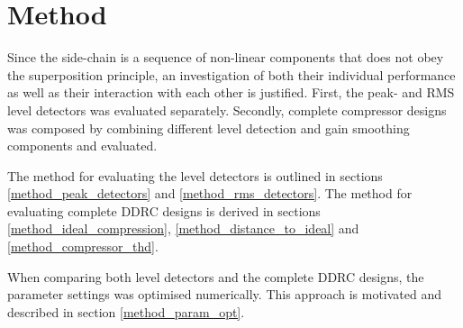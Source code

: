 \documentclass[../main2.tex]{subfiles}
\providecommand{\rootdir}{..}
\begin{document}
\section{Method}\label{method}
Since the side-chain is a sequence of non-linear components that does not obey the superposition principle, an investigation of both their individual performance as well as their interaction with each other is justified. First, the peak- and RMS level detectors was evaluated separately. Secondly, complete compressor designs was composed by combining different level detection and gain smoothing components and evaluated.

The method for evaluating the level detectors is outlined in sections \ref{method_peak_detectors} and \ref{method_rms_detectors}. The method for evaluating complete DDRC designs is derived in sections \ref{method_ideal_compression}, \ref{method_distance_to_ideal} and \ref{method_compressor_thd}.

When comparing both level detectors and the complete DDRC designs, the parameter settings was optimised numerically. This approach is motivated and described in section \ref{method_param_opt}.










\end{document}
